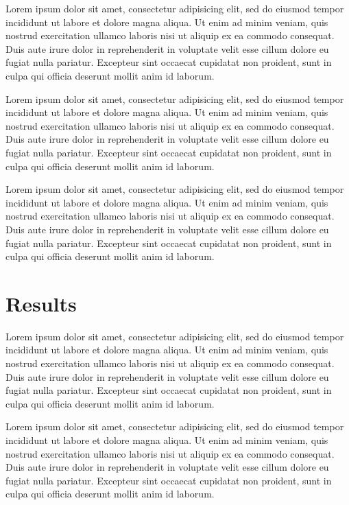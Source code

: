\documentclass[11pt,letterpaper]{article}
\begin{document}
Lorem ipsum dolor sit amet, consectetur adipisicing elit, sed do eiusmod tempor incididunt ut labore et dolore magna aliqua. Ut enim ad minim veniam, quis nostrud exercitation ullamco laboris nisi ut aliquip ex ea commodo consequat. Duis aute irure dolor in reprehenderit in voluptate velit esse cillum dolore eu fugiat nulla pariatur. Excepteur sint occaecat cupidatat non proident, sunt in culpa qui officia deserunt mollit anim id laborum.

Lorem ipsum dolor sit amet, consectetur adipisicing elit, sed do eiusmod tempor incididunt ut labore et dolore magna aliqua. Ut enim ad minim veniam, quis nostrud exercitation ullamco laboris nisi ut aliquip ex ea commodo consequat. Duis aute irure dolor in reprehenderit in voluptate velit esse cillum dolore eu fugiat nulla pariatur. Excepteur sint occaecat cupidatat non proident, sunt in culpa qui officia deserunt mollit anim id laborum.

Lorem ipsum dolor sit amet, consectetur adipisicing elit, sed do eiusmod tempor incididunt ut labore et dolore magna aliqua. Ut enim ad minim veniam, quis nostrud exercitation ullamco laboris nisi ut aliquip ex ea commodo consequat. Duis aute irure dolor in reprehenderit in voluptate velit esse cillum dolore eu fugiat nulla pariatur. Excepteur sint occaecat cupidatat non proident, sunt in culpa qui officia deserunt mollit anim id laborum.

\section{Results}

Lorem ipsum dolor sit amet, consectetur adipisicing elit, sed do eiusmod tempor incididunt ut labore et dolore magna aliqua. Ut enim ad minim veniam, quis nostrud exercitation ullamco laboris nisi ut aliquip ex ea commodo consequat. Duis aute irure dolor in reprehenderit in voluptate velit esse cillum dolore eu fugiat nulla pariatur. Excepteur sint occaecat cupidatat non proident, sunt in culpa qui officia deserunt mollit anim id laborum.

Lorem ipsum dolor sit amet, consectetur adipisicing elit, sed do eiusmod tempor incididunt ut labore et dolore magna aliqua. Ut enim ad minim veniam, quis nostrud exercitation ullamco laboris nisi ut aliquip ex ea commodo consequat. Duis aute irure dolor in reprehenderit in voluptate velit esse cillum dolore eu fugiat nulla pariatur. Excepteur sint occaecat cupidatat non proident, sunt in culpa qui officia deserunt mollit anim id laborum.
\end{document}

